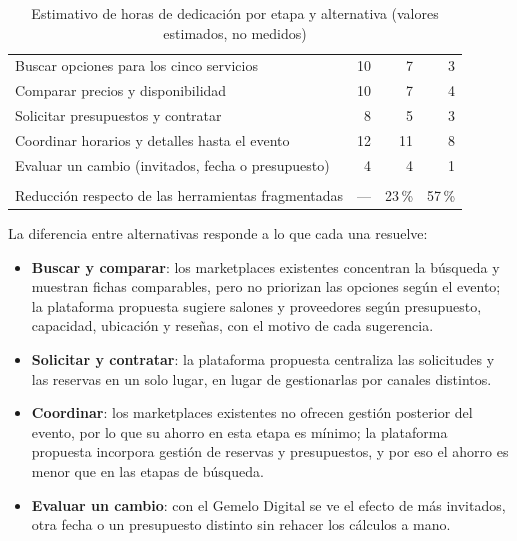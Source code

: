 \begin{table}[H]
    \centering
    \caption{Estimativo de horas de dedicación por etapa y alternativa (valores estimados, no medidos)}
    \label{tab:ahorro-tiempo}
    \small
    \begin{tabularx}{\textwidth}{L R R R}
        \toprule
         &  &  &  \\
        \midrule
        Buscar opciones para los cinco servicios & 10 & 7 & 3 \\
        Comparar precios y disponibilidad & 10 & 7 & 4 \\
        Solicitar presupuestos y contratar & 8 & 5 & 3 \\
        Coordinar horarios y detalles hasta el evento & 12 & 11 & 8 \\
        Evaluar un cambio (invitados, fecha o presupuesto) & 4 & 4 & 1 \\
        \midrule
         &  &  &  \\
        Reducción respecto de las herramientas fragmentadas & --- & 23\,\% & 57\,\% \\
        \bottomrule
    \end{tabularx}
\end{table}

La diferencia entre alternativas responde a lo que cada una resuelve:
\begin{itemize}
    \item \textbf{Buscar y comparar}: los marketplaces existentes
          concentran la búsqueda y muestran fichas comparables, pero no
          priorizan las opciones según el evento; la plataforma propuesta
          sugiere salones y proveedores según presupuesto, capacidad,
          ubicación y reseñas, con el motivo de cada sugerencia.
    \item \textbf{Solicitar y contratar}: la plataforma propuesta
          centraliza las solicitudes y las reservas en un solo lugar, en
          lugar de gestionarlas por canales distintos.
    \item \textbf{Coordinar}: los marketplaces existentes no ofrecen
          gestión posterior del evento, por lo que su ahorro en esta
          etapa es mínimo; la plataforma propuesta incorpora gestión de
          reservas y presupuestos, y por eso el ahorro es menor que en
          las etapas de búsqueda.
    \item \textbf{Evaluar un cambio}: con el Gemelo Digital se ve el
          efecto de más invitados, otra fecha o un presupuesto distinto
          sin rehacer los cálculos a mano.
\end{itemize}

